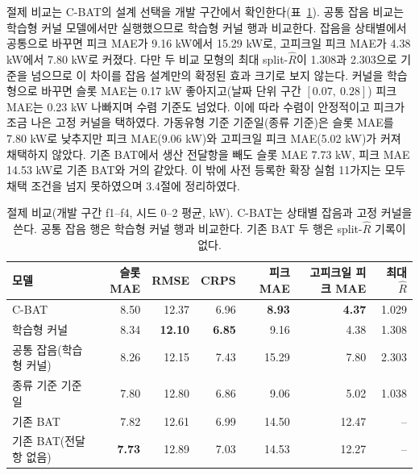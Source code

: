절제 비교는 C-BAT의 설계 선택을 개발 구간에서 확인한다(표~\ref{tab:ch2-ablation}). 공통 잡음 비교는 학습형 커널 모델에서만 실행했으므로 학습형 커널 행과 비교한다. 잡음을 상태별에서 공통으로 바꾸면 피크 MAE가 9.16 kW에서 15.29 kW로, 고피크일 피크 MAE가 4.38 kW에서 7.80 kW로 커졌다. 다만 두 비교 모형의 최대 split-$\hat R$이 1.308과 2.303으로 기준을 넘으므로 이 차이를 잡음 설계만의 확정된 효과 크기로 보지 않는다. 커널을 학습형으로 바꾸면 슬롯 MAE는 0.17 kW 좋아지고(날짜 단위 구간 $[0.07,\ 0.28]$) 피크 MAE는 0.23 kW 나빠지며 수렴 기준도 넘었다. 이에 따라 수렴이 안정적이고 피크가 조금 나은 고정 커널을 택하였다. 가동유형 기준 기준일(종류 기준)은 슬롯 MAE를 7.80 kW로 낮추지만 피크 MAE(9.06 kW)와 고피크일 피크 MAE(5.02 kW)가 커져 채택하지 않았다. 기존 BAT에서 생산 전달항을 빼도 슬롯 MAE 7.73 kW, 피크 MAE 14.53 kW로 기존 BAT와 거의 같았다. 이 밖에 사전 등록한 확장 실험 11가지는 모두 채택 조건을 넘지 못하였으며 3.4절에 정리하였다.

\begin{table}[htbp]
\centering
\hwptablefont
\caption{절제 비교(개발 구간 f1--f4, 시드 0--2 평균, kW). C-BAT는 상태별 잡음과 고정 커널을 쓴다. 공통 잡음 행은 학습형 커널 행과 비교한다. 기존 BAT 두 행은 split-$\hat R$ 기록이 없다.}\label{tab:ch2-ablation}
\begin{tabular}{lrrrrrr}
\toprule
모델 & 슬롯 MAE & RMSE & CRPS & 피크 MAE & 고피크일 피크 MAE & 최대 $\hat R$ \\
\midrule
C-BAT & 8.50 & 12.37 & 6.96 & \textbf{8.93} & \textbf{4.37} & 1.029 \\
학습형 커널 & 8.34 & \textbf{12.10} & \textbf{6.85} & 9.16 & 4.38 & 1.308 \\
공통 잡음(학습형 커널) & 8.26 & 12.15 & 7.43 & 15.29 & 7.80 & 2.303 \\
종류 기준 기준일 & 7.80 & 12.80 & 6.86 & 9.06 & 5.02 & 1.038 \\
기존 BAT & 7.82 & 12.61 & 6.99 & 14.50 & 12.47 & -- \\
기존 BAT(전달항 없음) & \textbf{7.73} & 12.89 & 7.03 & 14.53 & 12.27 & -- \\
\bottomrule
\end{tabular}
\end{table}

